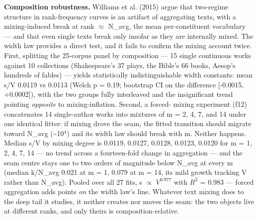 \documentclass[11pt]{article}
\begin{document}
\textbf{Composition robustness.} Williams et al. (2015) argue that two-regime structure in rank-frequency curves is an artifact of aggregating texts, with a mixing-induced break at rank $\approx$ N\_avg, the mean per-constituent vocabulary --- and that even single texts break only insofar as they are internally mixed. The width law provides a direct test, and it fails to confirm the mixing account twice. First, splitting the 25-corpus panel by composition --- 15 single continuous works against 10 collections (Shakespeare's 37 plays, the Bible's 66 books, Aesop's hundreds of fables) --- yields statistically indistinguishable width constants: mean s/V 0.0119 vs 0.0113 (Welch p = 0.19; bootstrap CI on the difference [-0.0015, +0.0002]), with the two groups fully interleaved and the insignificant trend pointing \emph{opposite} to mixing-inflation. Second, a forced- mixing experiment (f12) concatenates 14 single-author works into mixtures of m = 2, 4, 7, and 14 under one identical fitter: if mixing drove the seam, the fitted transition should migrate toward N\_avg (\~{}10$^{4}$) and its width law should break with m. Neither happens. Median s/V by mixing degree is 0.0119, 0.0127, 0.0128, 0.0123, 0.0120 for m = 1, 2, 4, 7, 14 --- no trend across a fourteen-fold change in aggregation --- and the seam centre stays one to two orders of magnitude below N\_avg at every m (median k/N\_avg 0.021 at m = 1, 0.079 at m = 14, its mild growth tracking V rather than N\_avg). Pooled over all 27 fits, s $\propto$ $V^{0.977}$ with $R^2$ = 0.983 --- forced aggregation adds points \emph{on} the width law's line. Whatever text mixing does to the deep tail it studies, it neither creates nor moves the seam: the two objects live at different ranks, and only theirs is composition-relative.
\end{document}
